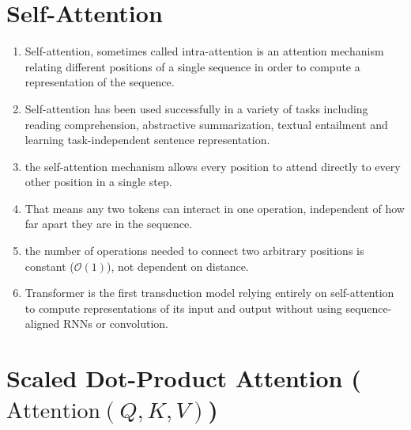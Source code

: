 \section{Self-Attention}

\begin{enumerate}
    \item Self-attention, sometimes called intra-attention is an attention mechanism relating different positions of a single sequence in order to compute a representation of the sequence. 
    \hfill \cite{arxiv/1706.03762/Attention-Is-All-You-Need}

    \item Self-attention has been used successfully in a variety of tasks including reading comprehension, abstractive summarization, textual entailment and learning task-independent sentence representation.
    \hfill \cite{arxiv/1706.03762/Attention-Is-All-You-Need}

    \item the self-attention mechanism allows every position to attend directly to every other position in a single step.
    \hfill \cite{common/online/chatgpt}

    \item That means any two tokens can interact in one operation, independent of how far apart they are in the sequence.
    \hfill \cite{common/online/chatgpt}

    \item the number of operations needed to connect two arbitrary positions is constant ($\mathcal{O}(1)$), not dependent on distance.
    \hfill \cite{common/online/chatgpt}

    \item Transformer is the first transduction model relying entirely on self-attention to compute representations of its input and output without using sequence-aligned RNNs or convolution. 
    \hfill \cite{arxiv/1706.03762/Attention-Is-All-You-Need}
\end{enumerate}





\section{Scaled Dot-Product Attention ($\text{Attention}(Q, K, V )$)}

